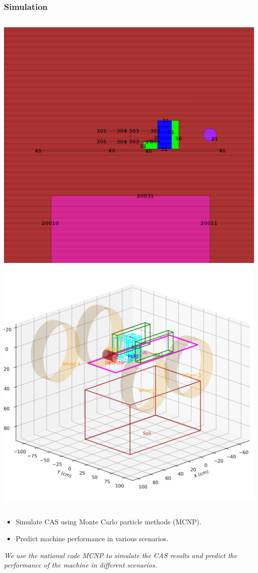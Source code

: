 \documentclass[notheorems,11pt,compress]{beamer}
\begin{document}
\begin{frame}
\frametitle{Simulation}
\begin{columns}
\includegraphics[width=\linewidth]{minsinmcnp.png}
\includegraphics[width=\linewidth]{minsin3d.png}
\end{columns}
\vspace{1em}
\begin{itemize}
    \item Simulate CAS using Monte Carlo particle methods (MCNP).
    \item Predict machine performance in various scenarios.
\end{itemize}
\small
\textit{We use the national code MCNP to simulate the CAS results and predict the performance of the machine in different scenarios.}
\end{frame}
\end{document}
